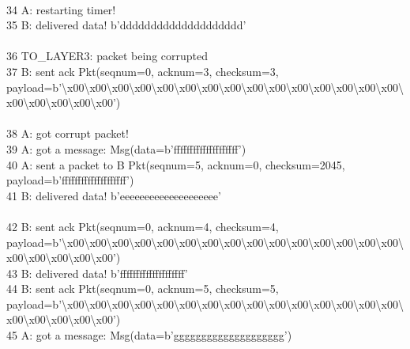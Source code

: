 \documentclass{article}
\begin{document}
{\\
34 A: restarting timer! \\
35 B: delivered data! b'dddddddddddddddddddd' \\
 \\
36     \hspace*{10mm}      TO\_LAYER3: packet being corrupted \\
37 B: sent ack Pkt(seqnum=0, acknum=3, checksum=3,
payload=b'\textbackslash{}x00\textbackslash{}x00\textbackslash{}x00\textbackslash{}x00\textbackslash{}x00\textbackslash{}x00\textbackslash{}x00\textbackslash{}x00\textbackslash{}x00\textbackslash{}x00\textbackslash{}x00\textbackslash{}x00\textbackslash{}x00\textbackslash{}x00\textbackslash{}x00\textbackslash{}x00\textbackslash{}x00\textbackslash{}x00\textbackslash{}x00\textbackslash{}x00')
\\
 \\
38 A: got corrupt packet! \\
39 A: got a message: Msg(data=b'ffffffffffffffffffff') \\
40 A: sent a packet to B Pkt(seqnum=5, acknum=0, checksum=2045,
payload=b'ffffffffffffffffffff') \\
41 B: delivered data! b'eeeeeeeeeeeeeeeeeeee' \\
 \\
42 B: sent ack Pkt(seqnum=0, acknum=4, checksum=4,
payload=b'\textbackslash{}x00\textbackslash{}x00\textbackslash{}x00\textbackslash{}x00\textbackslash{}x00\textbackslash{}x00\textbackslash{}x00\textbackslash{}x00\textbackslash{}x00\textbackslash{}x00\textbackslash{}x00\textbackslash{}x00\textbackslash{}x00\textbackslash{}x00\textbackslash{}x00\textbackslash{}x00\textbackslash{}x00\textbackslash{}x00\textbackslash{}x00\textbackslash{}x00')
\\
43 B: delivered data! b'ffffffffffffffffffff' \\
44 B: sent ack Pkt(seqnum=0, acknum=5, checksum=5,
payload=b'\textbackslash{}x00\textbackslash{}x00\textbackslash{}x00\textbackslash{}x00\textbackslash{}x00\textbackslash{}x00\textbackslash{}x00\textbackslash{}x00\textbackslash{}x00\textbackslash{}x00\textbackslash{}x00\textbackslash{}x00\textbackslash{}x00\textbackslash{}x00\textbackslash{}x00\textbackslash{}x00\textbackslash{}x00\textbackslash{}x00\textbackslash{}x00\textbackslash{}x00')
\\
45 A: got a message: Msg(data=b'gggggggggggggggggggg') \\
}
\end{document}
